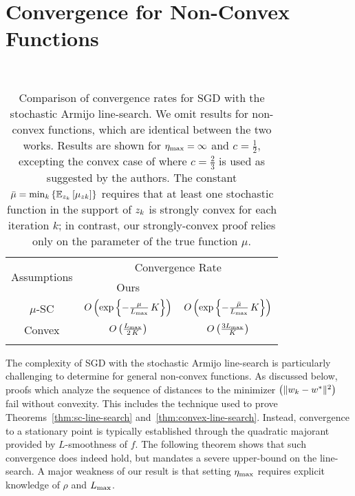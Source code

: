 \section{Convergence for Non-Convex Functions}~\label{sec:ls-nc}

\begin{table}[t]
    \centering
    \begin{tabular}{c c c  }\toprule
        \multirow{2}{*}{Assumptions} & \multicolumn{2}{c}{Convergence Rate}\\%
        \cmidrule(lr){2-3} 
                 & \multicolumn{1}{c}{Ours} & \multicolumn{1}{c}{\citet{vaswani2019painless}}\\ \midrule
        \( \mu \)-SC & \( O\left(\exp\left\{- \frac{\mu}{L_{\text{max}}} \, K\right\}\right) \)%
                     & \( O\left(\exp\left\{- \frac{\bar \mu}{L_{\text{max}}} \, K\right\}\right) \) \\ \addlinespace
    Convex       & \( O\left(\frac{L_{\text{max}}}{2 \, K}\right) \)%
                 & \( O\left(\frac{3 L_{\text{max}}}{K}\right) \)\\ \addlinespace 
        \end{tabular}
        \caption{Comparison of convergence rates for \ac{SGD} with the stochastic Armijo line-search.  We omit results for non-convex functions, which are identical between the two works. Results are shown for \( \eta_{\text{max}} = \infty \) and \( c = \frac{1}{2} \), excepting the convex case of \citet{vaswani2019painless} where \( c = \frac{2}{3} \) is used as suggested by the authors. The constant \( \bar \mu = \min_k \left\{\mathbb{E}_{z_{k}} \left[\mu_{zk}\right] \right\} \) requires that at least one stochastic function in the support of \( z_{k} \) is strongly convex for each iteration \( k \); in contrast, our strongly-convex proof relies only on the parameter of the true function \( \mu \).  }%
    \label{table:ls-comparison}
\end{table}

The complexity of \ac{SGD} with the stochastic Armijo line-search is particularly challenging to determine for general non-convex functions.
As discussed below, proofs which analyze the sequence of distances to the minimizer \( \left(\|w_k - w^*\|^2\right) \) fail without convexity.
This includes the technique used to prove Theorems~\ref{thm:sc-line-search} and~\ref{thm:convex-line-search}.
Instead, convergence to a stationary point is typically established through the quadratic majorant provided by \( L \)-smoothness of \( f \).
The following theorem shows that such convergence does indeed hold, but mandates a severe upper-bound on the line-search.
A major weakness of our result is that setting \( \eta_{\text{max}} \) requires explicit knowledge of \( \rho \) and \( L_{\text{max}} \). 

